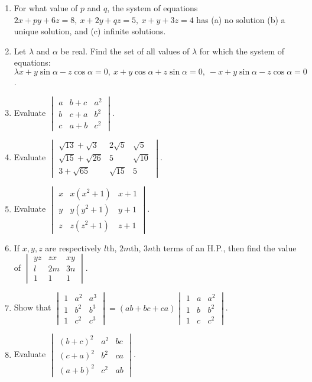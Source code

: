 \begin{enumerate}[resume]
\item For what value of $p$ and $q$, the system of equations $2x + py + 6z = 8,\ x + 2y + qz = 5,\ x + y + 3z = 4$ has (a) no
  solution (b) a unique solution, and (c) infinite solutions.
\item Let $\lambda$ and $\alpha$ be real. Find the set of all values of $\lambda$ for which the system of equations: $\lambda x +
  y\sin\alpha - z\cos\alpha = 0,\ x + y\cos\alpha + z\sin\alpha = 0,\ -x + y\sin\alpha - z\cos\alpha = 0$.
\item Evaluate $\begin{vmatrix}a & b + c & a^2\\b & c + a & b^2\\c & a + b & c^2\end{vmatrix}$.
\item Evaluate $\begin{vmatrix}\sqrt{13} + \sqrt{3} & 2\sqrt{5} & \sqrt{5}\\ \sqrt{15} + \sqrt{26} & 5 & \sqrt{10}\\ 3 + \sqrt{65}
  & \sqrt{15} & 5\end{vmatrix}$.
\item Evaluate $\begin{vmatrix}x & x(x^2 + 1) & x + 1\\y & y(y^2 + 1) & y + 1\\z & z(z^2 + 1) & z + 1\end{vmatrix}$.
\item If $x, y, z$ are respectively $l$th, $2m$th, $3n$th terms of an H.P., then find the value of $\begin{vmatrix}yz & zx & xy
  \\ l & 2m & 3n\\1 & 1 & 1\end{vmatrix}$.
\item Show that $\begin{vmatrix}1 & a^2 & a^3\\1 & b^2 & b^3\\1 & c^2 & c^3\end{vmatrix} = (ab + bc + ca)\begin{vmatrix}1 & a &
    a^2\\1 & b & b^2\\1 & c & c^2\end{vmatrix}$.
\item Evaluate $\begin{vmatrix}(b + c)^2 & a^2 & bc\\(c + a)^2 & b^2 & ca\\ (a + b)^2 & c^2 & ab\end{vmatrix}$.

\end{enumerate}
